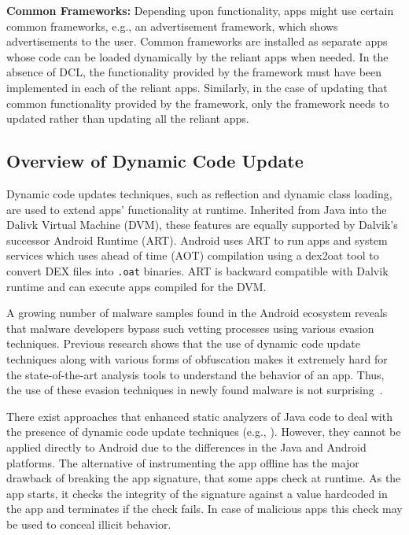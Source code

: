 \textbf{Common Frameworks:} Depending upon functionality, apps might use certain common frameworks, e.g., an advertisement framework, which shows advertisements to the user. Common frameworks are installed as separate apps whose code can be loaded dynamically by the reliant apps when needed. In the absence of DCL, the functionality provided by the framework must have been implemented in each of the reliant apps. Similarly, in the case of updating that common functionality provided by the framework, only the framework needs to updated rather than updating all the reliant apps. 


\subsection{Overview of Dynamic Code Update}

Dynamic code updates techniques, such as reflection and dynamic class loading, are used to extend apps' functionality at runtime. Inherited from Java into the Dalivk Virtual Machine (DVM), these features are equally supported by Dalvik's successor Android Runtime (ART). Android uses ART to run apps and system services which uses ahead of time (AOT) compilation using a dex2oat tool to convert DEX files into \texttt{.oat} binaries. ART is backward compatible with Dalvik runtime and can execute apps compiled for the DVM. 


A growing number of malware samples found in the Android ecosystem reveals that malware developers bypass such vetting processes using various evasion techniques. Previous research shows that the use of dynamic code update techniques along with various forms of obfuscation makes it extremely hard for the state-of-the-art analysis tools to understand the behavior of an app\cite{ExecuteThis_Poeplau2014, ahmad2016empirical}. Thus, the use of these evasion techniques in newly found malware is not surprising~\cite{brain-test}.

There exist approaches that enhanced static analyzers of Java code to deal with the presence of dynamic code update techniques (e.g., \cite{TamingReflection_Bodden2011}). However, they cannot be  applied directly to Android due to the differences in the Java and Android platforms. The alternative of instrumenting the app offline has the  major drawback of breaking the app signature, that some apps check  at runtime. As the app starts, it checks the integrity of the signature against  a  value hardcoded in the app and terminates if the check fails. In case of malicious apps this check may be used to conceal illicit behavior. 


